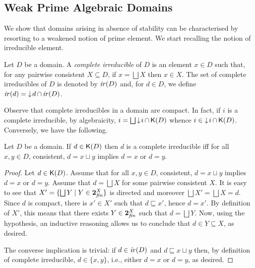 \subsection{Weak Prime Algebraic Domains}
\label{ss:weakdomains}

We show that domains arising in absence of stability can be
characterised by resorting to a weakened notion of prime element. 
We start recalling the notion of irreducible element.

\begin{definition}[irreducibles]
  Let $D$ be a domain. A \emph{complete irreducible} of $D$ is an
  element $x \in D$ such that, for any pairwise consistent
  $X \subseteq D$, if $x = \bigsqcup X$ then $x \in X$.  The set of
  complete irreducibles of $D$ is denoted by $\mathop{\mathit{ir}({D})}$ and, for
  $d \in D$, we define $\mathop{\mathit{ir}({d})} = \mathop{\downarrow\!{d}} \cap \mathop{\mathit{ir}({D})}$.
\end{definition}

Observe that complete irreducibles in a domain are compact. In fact,
if $i$ is a complete irreducible, by algebraicity,
$i = \bigsqcup \mathop{\downarrow\!{i}} \cap \mathop{\mathsf{K}({D})}$ whence
$i \in \mathop{\downarrow\!{i}} \cap \mathop{\mathsf{K}({D})}$. Conversely, we have the following.

\begin{lemma}
  \label{le:comp-irr}
  Let $D$ be a domain. If $d \in \mathop{\mathsf{K}({D})}$ then $d$ is a complete
  irreducible iff for all $x, y \in D$, consistent,
  $d = x \sqcup y$ implies $d = x$ or $d=y$.
\end{lemma}

\begin{proof}
  Let $d \in \mathop{\mathsf{K}({D})}$. Assume that for all $x, y \in D$, consistent,
  $d = x \sqcup y$ implies $d = x$ or $d=y$.
  Assume that $d = \bigsqcup X$ for some pairwise consistent $X$. It
  is easy to see that $X' = \{ \bigsqcup Y \mid Y \in \mathbf{2}_\mathit{fin}^{X} \}$
  is directed and {moreover} $\bigsqcup X' = \bigsqcup X = d$. Since $d$
  is compact, there is $x' \in X'$ such that $d \sqsubseteq x'$, hence
  $d = x'$. By definition of $X'$, this means that there exists
  $Y \in \mathbf{2}_\mathit{fin}^{X}$ such that $d = \bigsqcup Y$. {Now, using the hypothesis,
  an inductive reasoning} allows us to conclude that
  $d \in Y \subseteq X$, as desired.

  The converse implication is trivial: if $d \in \mathop{\mathit{ir}({D})}$ and
  $d \sqsubseteq x \sqcup y$ then, by definition of complete
  irreducible, $d \in \{x,y\}$, i.e., either $d=x$ or $d=y$, as
  desired.
\end{proof}


